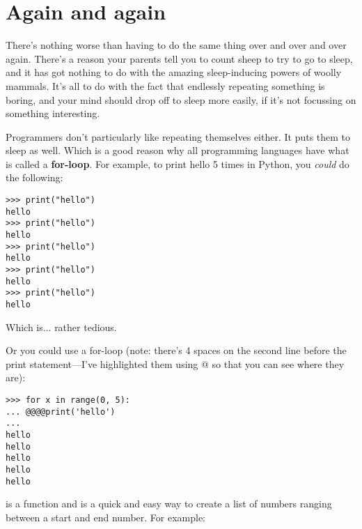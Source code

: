 

\chapter{Again and again}\label{ch:againandagain}

There's nothing worse than having to do the same thing over and over and over again.  There's a reason your parents tell you to count sheep to try to go to sleep, and it has got nothing to do with the amazing sleep-inducing powers of woolly mammals.  It's all to do with the fact that endlessly repeating something is boring, and your mind should drop off to sleep more easily, if it's not focussing on something interesting.
\par
Programmers don't particularly like repeating themselves either. It puts them to sleep as well.  Which is a good reason why all programming languages have what is called a \textbf{for-loop}. For example, to print hello 5 times in Python, you \emph{could} do the following:

\begin{listing}
\begin{verbatim}
>>> print("hello")
hello
>>> print("hello")
hello
>>> print("hello")
hello
>>> print("hello")
hello
>>> print("hello")
hello
\end{verbatim}
\end{listing}

Which is$\ldots$ rather tedious.

Or you could use a for-loop (note: there's 4 spaces on the second line before the print statement---I've highlighted them using @ so that you can see where they are):

\begin{listingignore}
\begin{verbatim}
>>> for x in range(0, 5):
... @@@@print('hello')
... 
hello
hello
hello
hello
hello
\end{verbatim}
\end{listingignore}

 is a function and is a quick and easy way to create a list of numbers ranging between a start and end number. For example:

